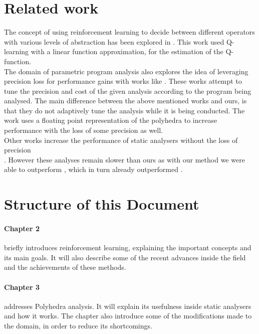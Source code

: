 \section{Related work}
The concept of using reinforcement learning to decide between different operators with various levels of abstraction has been explored in \cite{singh2018fast}. This work used Q-learning with a linear function approximation, for the estimation of the Q-function.\\
The domain of parametric program analysis also explores the idea of leveraging precision loss for performance gains with works like \cite{oh2015learning,oh2014selective,liang2011learning}. These works attempt to tune the precision and cost of the given analysis according to the program being analysed. The main difference between the above mentioned works and ours, is that they do not adaptively tune the analysis while it is being conducted. The work \cite{chen2008sound} uses a floating point representation of the polyhedra to increase performance with the loss of some precision as well.\\
Other works increase the performance of static analysers without the loss of precision \\ \cite{singh2015making,singh2017fast}. However these analyses remain slower than ours as with our method we were able to outperform \cite{singh2018fast}, which in turn already outperformed \cite{singh2017fast}. 


\section{Structure of this Document}

\paragraph{Chapter 2}briefly introduces reinforcement learning, explaining the important concepts and its main goals. It will also describe some of the recent advances inside the field and the achievements of these methods.

\paragraph{Chapter 3}addresses Polyhedra analysis. It will explain its usefulness inside static analysers and how it works. The chapter also introduce some of the modifications made to the domain, in order to reduce its shortcomings.

